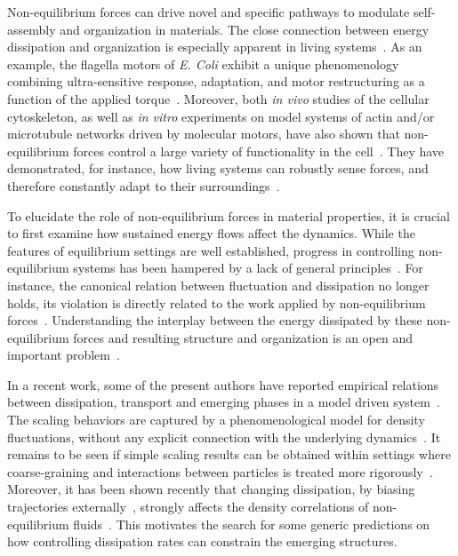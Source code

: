\documentclass[pre, superscriptaddress, twocolumn,pre]{revtex4-1}
\begin{document}
Non-equilibrium forces can drive novel and specific pathways to modulate self-assembly and organization in materials. The close connection between energy dissipation and organization is especially apparent in living systems~\cite{Toyabe2010, Ahmed2016, Battle604}. As an example, the flagella motors of {\it E. Coli} exhibit a unique phenomenology combining ultra-sensitive response, adaptation, and motor restructuring as a function of the applied torque~\cite{Lele2013, Lan2012, Wang2017}. Moreover, both {\it in vivo} studies of the cellular cytoskeleton, as well as {\it in vitro} experiments on model systems of actin and/or microtubule networks driven by molecular motors, have also shown that non-equilibrium forces control a large variety of functionality in the cell~\cite{Silva2011, Sanchez2012, Blanchoin2014, Murrell2015}. They have demonstrated, for instance, how living systems can robustly sense forces, and therefore constantly adapt to their surroundings~\cite{Decamp2015}. 


To elucidate the role of non-equilibrium forces in material properties, it is crucial to first examine how sustained energy flows affect the dynamics. While the features of equilibrium settings are well established, progress in controlling non-equilibrium systems has been hampered by a lack of general principles~\cite{Takatori2015, Cates2015, Solon2015a, Nguyen2016, Fodor2016, Murugan2017, Nguyen2018}. For instance, the canonical relation between fluctuation and dissipation no longer holds, its violation is directly related to the work applied by non-equilibrium forces~\cite{Harada2005, Harada2006}. Understanding the interplay between the energy dissipated by these non-equilibrium forces and resulting structure and organization is an open and important problem~\cite{Mizuno2007, Wilhelm2008, Visco2015, Turlier2016, Nardini2017}.


In a recent work, some of the present authors have reported empirical relations between dissipation, transport and emerging phases in a model driven system~\cite{Han2016, delJunco2018}. The scaling behaviors are captured by a phenomenological model for density fluctuations, without any explicit connection with the underlying dynamics~\cite{Chandler1993}. It remains to be seen if simple scaling results can be obtained within settings where coarse-graining and interactions between particles is treated more rigorously~\cite{Dean1996, Demery2011, Demery2014}. Moreover, it has been shown recently that changing dissipation, by biasing trajectories externally~\cite{Lecomte2007, Touchette2009, Jack2010}, strongly affects the density correlations of non-equilibrium fluids~\cite{Nemoto2018a}. This motivates the search for some generic predictions on how controlling dissipation rates can constrain the emerging structures.
\end{document}
